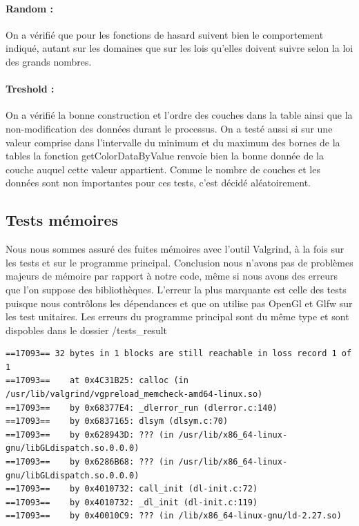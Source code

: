 \documentclass[a4paper]{article}
\begin{document}
\paragraph{Random : } On a vérifié que pour les fonctions de hasard suivent bien le comportement indiqué, autant sur les domaines que sur les lois qu'elles doivent suivre selon la loi des grands nombres.

\paragraph{Treshold : } On a vérifié la bonne construction et l'ordre des couches dans la table ainsi que la non-modification des données durant le processus. 
On a testé aussi si sur une valeur comprise dans l'intervalle du minimum et du maximum des bornes de la tables la fonction getColorDataByValue renvoie bien la bonne donnée de la couche auquel cette valeur appartient.
Comme le nombre de couches et les données sont non importantes pour ces tests, c'est décidé aléatoirement.

\subsection{Tests mémoires}

Nous nous sommes assuré des fuites mémoires avec l'outil Valgrind, à la fois sur les tests et sur le programme principal.
Conclusion nous n'avons pas de problèmes majeurs de mémoire par rapport à notre code, même si nous avons des erreurs que l'on suppose des bibliothèques. 
L'erreur la plus marquante est celle des tests puisque nous contrôlons les dépendances et que on utilise pas OpenGl et Glfw sur les test unitaires. Les erreurs du programme principal sont du même type et sont dispobles dans le dossier /tests\_result

\begin{lstlisting}[caption= Extrait de la commande valgrind \\ 
\texttt{valgrind --leak-check=full --show-leak-kinds=all --log-file="../tests\_result/valgrind\_tests.txt" ./unit\_tests}]
==17093== 32 bytes in 1 blocks are still reachable in loss record 1 of 1
==17093==    at 0x4C31B25: calloc (in /usr/lib/valgrind/vgpreload_memcheck-amd64-linux.so)
==17093==    by 0x68377E4: _dlerror_run (dlerror.c:140)
==17093==    by 0x6837165: dlsym (dlsym.c:70)
==17093==    by 0x628943D: ??? (in /usr/lib/x86_64-linux-gnu/libGLdispatch.so.0.0.0)
==17093==    by 0x6286B68: ??? (in /usr/lib/x86_64-linux-gnu/libGLdispatch.so.0.0.0)
==17093==    by 0x4010732: call_init (dl-init.c:72)
==17093==    by 0x4010732: _dl_init (dl-init.c:119)
==17093==    by 0x40010C9: ??? (in /lib/x86_64-linux-gnu/ld-2.27.so)
\end{lstlisting}
\end{document}
